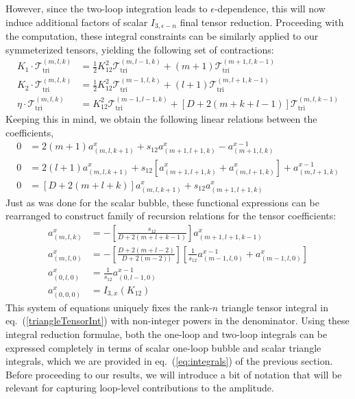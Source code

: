 \documentclass[12pt,letter]{article}
\def\eqn#1{eq.~(\ref{#1})}
\begin{document}
 However, since the two-loop integration leads to $\epsilon$-dependence, this will now induce additional factors of scalar $I_{3,\epsilon - n}$ final tensor reduction. Proceeding with the computation, these integral constraints can be similarly applied to our symmeterized tensors, yielding the following set of contractions:
\begin{align}
K_1\cdot \mathcal{T}^{(m,l,k)}_{\text{tri}} &=\frac{1}{2}K_{12}^2\mathcal{T}^{(m,l-1,k)}_{\text{tri}} + (m+1)\mathcal{T}^{(m+1,l,k-1)}_{\text{tri}} 
\\
K_2\cdot \mathcal{T}^{(m,l,k)}_{\text{tri}} &=\frac{1}{2}K_{12}^2\mathcal{T}^{(m-1,l,k)}_{\text{tri}} +(l+1)\mathcal{T}^{(m,l+1,k-1)}_{\text{tri}} 
\\
\eta\cdot  \mathcal{T}^{(m,l,k)}_{\text{tri}} &= K_{12}^2\mathcal{T}^{(m-1,l-1,k)}_{\text{tri}} +\left[D+2(m+k+l-1)\right]\mathcal{T}^{(m,l,k-1)}_{\text{tri}} 
\end{align}
Keeping this in mind, we obtain the following linear relations between the coefficients,
\begin{equation}
\begin{aligned}
0&=2(m+1)a_{(m,l,k+1)}^{x}+s_{12}a_{(m+1,l+1,k)}^{x}-a_{(m+1,l,k)}^{x-1}
\\
0&=2(l+1)a_{(m,l,k+1)}^{x}+s_{12}[a_{(m+1,l+1,k)}^{x}+a_{(m,l+1,k)}^{x}]+a_{(m,l+1,k)}^{x-1}
\\
0&=[D+2(m+l+k)]a_{(m,l,k+1)}^{x}+s_{12}a_{(m+1,l+1,k)}^{x}
\end{aligned}
\end{equation}
Just as was done for the scalar bubble, these functional expressions can be rearranged to construct family of recursion relations for the tensor coefficients:
\begin{equation}\label{eq:triRed}
\boxed{
\begin{aligned}
a_{(m,l,k)}^x&=-\left[\frac{s_{12}}{D+2(m+l+k-1)}\right]a_{(m+1,l+1,k-1)}^x
\\
a_{(m,l,0)}^x&=-\left[\frac{D+2(m+l-2)}{D+2(m-2))}\right]\left[\frac{1}{s_{12}} a^{x-1}_{(m-1,l,0)}+a^{x}_{(m-1,l,0)}\right]
\\
a^x_{(0,l,0)}&= \frac{1}{s_{12}} a_{(0,l-1,0)}^{x-1} 
\\
a^x_{(0,0,0)} &= I_{3,x}(K_{12})
\end{aligned}
}
\end{equation}
This system of equations uniquely fixes the rank-$n$ triangle tensor integral in \eqn{triangleTensorInt} with non-integer powers in the denominator. Using these integral reduction formulae, both the one-loop and two-loop integrals can be expressed completely in terms of scalar one-loop bubble and scalar triangle integrals, which we are provided in \eqn{eq:integrals} of the previous section. Before proceeding to our results, we will introduce a bit of notation that will be relevant for capturing loop-level contributions to the amplitude. 
\end{document}

